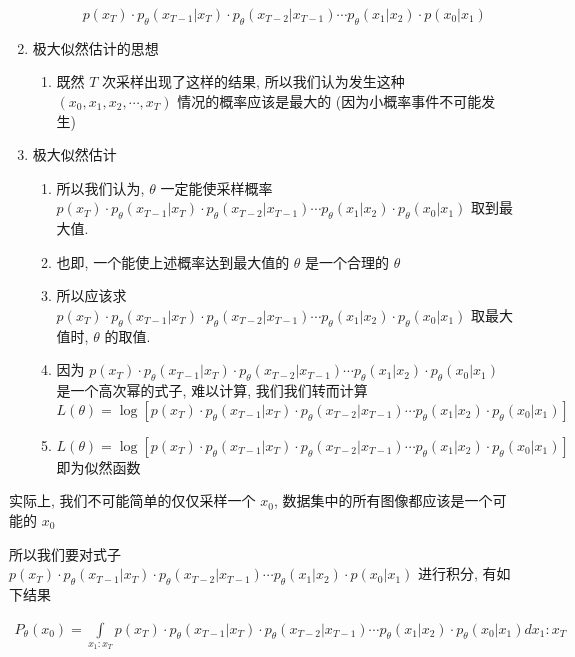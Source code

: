 \begin{enumerate}
\begin{enumerate}
        $$p (x_T)\cdot p_\theta(x_{T-1}|x_T)\cdot p_\theta(x_{T-2}|x_{T-1})\cdots p_\theta(x_1|x_2)\cdot p (x_0|x_1)$$
    \end{enumerate}
    \item 极大似然估计的思想
    \begin{enumerate}
        \item 既然 $T$ 次采样出现了这样的结果, 所以我们认为发生这种 $(x_0,x_1,x_2,\cdots,x_T)$ 情况的概率应该是最大的 (因为小概率事件不可能发生)
    \end{enumerate}
    \item 极大似然估计
    \begin{enumerate}
        \item 所以我们认为, $\theta$ 一定能使采样概率 $p (x_T)\cdot p_\theta(x_{T-1}|x_T)\cdot p_\theta(x_{T-2}|x_{T-1})\cdots p_\theta(x_1|x_2)\cdot p_\theta(x_0|x_1)$ 取到最大值.
        \item 也即, 一个能使上述概率达到最大值的 $\theta$ 是一个合理的 $\theta$
        \item 所以应该求 $p (x_T)\cdot p_\theta(x_{T-1}|x_T)\cdot p_\theta(x_{T-2}|x_{T-1})\cdots p_\theta(x_1|x_2)\cdot p_\theta(x_0|x_1)$ 取最大值时, $\theta$ 的取值.
        \item 因为 $p (x_T)\cdot p_\theta(x_{T-1}|x_T)\cdot p_\theta(x_{T-2}|x_{T-1})\cdots p_\theta(x_1|x_2)\cdot p_\theta (x_0|x_1)$ 是一个高次幂的式子, 难以计算, 我们我们转而计算 $L(\theta)=\log\left[ p (x_T)\cdot p_\theta(x_{T-1}|x_T)\cdot p_\theta(x_{T-2}|x_{T-1})\cdots p_\theta(x_1|x_2)\cdot p_\theta (x_0|x_1) \right]$ 
        \item $L(\theta)=\log\left[ p (x_T)\cdot p_\theta(x_{T-1}|x_T)\cdot p_\theta(x_{T-2}|x_{T-1})\cdots p_\theta(x_1|x_2)\cdot p_\theta (x_0|x_1) \right]$ 即为似然函数
    \end{enumerate}
\end{enumerate}

实际上, 我们不可能简单的仅仅采样一个 $x_0$, 数据集中的所有图像都应该是一个可能的 $x_0$

所以我们要对式子 $p (x_T)\cdot p_\theta(x_{T-1}|x_T)\cdot p_\theta(x_{T-2}|x_{T-1})\cdots p_\theta(x_1|x_2)\cdot p (x_0|x_1)$ 进行积分, 有如下结果

\begin{equation}
\begin{aligned}
    P_\theta(x_0)=\int\limits_{x_1:x_T}p (x_T)\cdot p_\theta(x_{T-1}|x_T)\cdot p_\theta(x_{T-2}|x_{T-1})\cdots p_\theta(x_1|x_2)\cdot p_\theta (x_0|x_1)dx_1:x_T
\end{aligned}
\end{equation}


